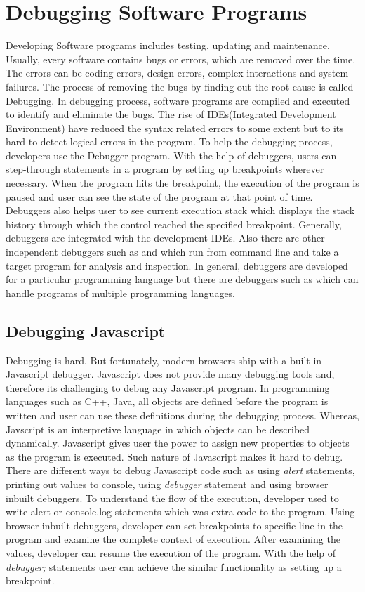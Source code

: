 \section{Debugging Software Programs}
Developing Software programs includes testing, updating and maintenance. Usually, every software contains bugs or errors, which are removed over the time. The errors can be coding errors, design errors, complex interactions and system failures. The process of removing the bugs by finding out the root cause is called Debugging. In debugging process, software programs are compiled and executed to identify and eliminate the bugs. The rise of IDEs(Integrated Development Environment) have reduced the syntax related errors to some extent but to its hard to detect logical errors in the program. To help the debugging process, developers use the Debugger program. With the help of debuggers, users can step-through statements in a program by setting up breakpoints wherever necessary. When the program hits the breakpoint, the execution of the program is paused and user can see the state of the program at that point of time. Debuggers also helps user to see current execution stack which displays the stack history through which the control reached the specified breakpoint. Generally, debuggers are integrated with the development IDEs. Also there are other independent debuggers such as \cite{oracleDebugger} and \cite{gnuDebugger} which run from command line and take a target program for analysis and inspection. In general, debuggers are developed for a particular programming language but there are debuggers such as \cite{gnuDebugger} which can handle programs of multiple programming languages.

\subsection{Debugging Javascript}
Debugging is hard. But fortunately, modern browsers ship with a built-in Javascript debugger. Javascript does not provide many debugging tools and, therefore its challenging to debug any Javascript program. In programming languages such as C++, Java, all objects are defined before the program is written and user can use these definitions during the debugging process\cite{hoffman2000data}. Whereas, Javscript is an interpretive language in which objects can be described dynamically. Javascript gives user the power to assign new properties to objects as the program is executed. Such nature of Javascript makes it hard to debug. There are different ways to debug Javascript code such as using \textit{alert} statements, printing out values to console, using \textit{debugger} statement and using browser inbuilt debuggers. To understand the flow of the execution, developer used to write alert or console.log statements which was extra code to the program. Using browser inbuilt debuggers, developer can set breakpoints to specific line in the program and examine the complete context of execution. After examining the values, developer can resume the execution of the program. With the help of \textit{debugger;} statements user can achieve the similar functionality as setting up a breakpoint. 

